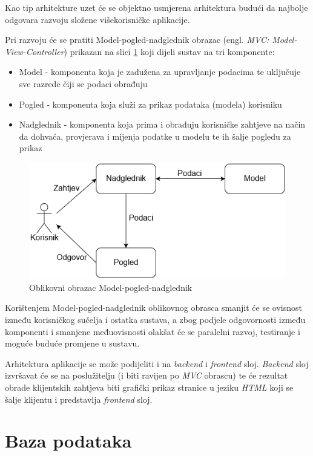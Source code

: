 		
		Kao tip arhitekture uzet će se objektno usmjerena arhitektura budući da najbolje odgovara razvoju složene višekorisničke aplikacije. 
		
		Pri razvoju će se pratiti Model-pogled-nadglednik obrazac (engl. \textit{MVC: Model-View-Controller}) prikazan na slici \ref{fig:mvc} koji dijeli sustav na tri komponente:
		\begin{itemize}
			\item Model - komponenta koja je zadužena za upravljanje podacima te uključuje sve razrede čiji se podaci obrađuju
			\item Pogled - komponenta koja služi za prikaz podataka (modela) korisniku
			\item Nadglednik - komponenta koja prima i obrađuju korisničke zahtjeve na način da dohvaća, provjerava i mijenja podatke u modelu te ih šalje pogledu za prikaz
		\end{itemize}
		
		\begin{figure}[h]
			\centering
			\includegraphics[width=0.7\linewidth]{slike/mvc}
			\caption{Oblikovni obrazac Model-pogled-nadglednik}
			\label{fig:mvc}
		\end{figure}
		
		Korištenjem Model-pogled-nadglednik oblikovnog obrasca smanjit će se ovisnost između korisničkog sučelja i ostatka sustava, a zbog podjele odgovornosti između komponenti i smanjene međuovisnosti olakšat će se paralelni razvoj, testiranje i moguće buduće promjene u sustavu.
		
		Arhitektura aplikacije se može podijeliti i na \textit{backend} i \textit{frontend} sloj. \textit{Backend} sloj izvršavat će se na poslužitelju (i biti ravijen po \textit{MVC} obrascu) te će rezultat obrade klijentskih zahtjeva biti grafički prikaz stranice u jeziku \textit{HTML} koji se šalje klijentu i predstavlja \textit{frontend} sloj.

		

				
		\section{Baza podataka}
			
